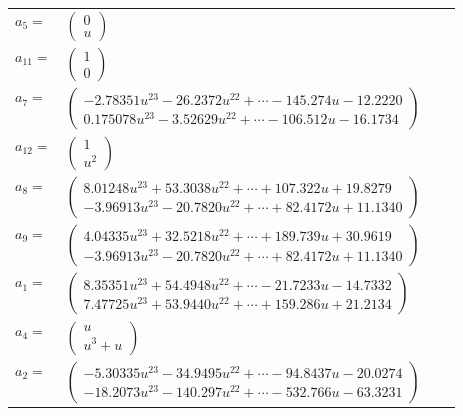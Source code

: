 \documentclass[1p]{elsarticle_modified}
\theoremstyle{definition}
\begin{document}
\begin{tabular}{m{7pt} m{180pt} m{7pt} m{180pt} }
\flushright $a_{5}=$&$\begin{pmatrix}0\\u\end{pmatrix}$ \\
\flushright $a_{11}=$&$\begin{pmatrix}1\\0\end{pmatrix}$ \\
\flushright $a_{7}=$&$\begin{pmatrix}-2.78351 u^{23}-26.2372 u^{22}+\cdots-145.274 u-12.2220\\0.175078 u^{23}-3.52629 u^{22}+\cdots-106.512 u-16.1734\end{pmatrix}$ \\
\flushright $a_{12}=$&$\begin{pmatrix}1\\u^2\end{pmatrix}$ \\
\flushright $a_{8}=$&$\begin{pmatrix}8.01248 u^{23}+53.3038 u^{22}+\cdots+107.322 u+19.8279\\-3.96913 u^{23}-20.7820 u^{22}+\cdots+82.4172 u+11.1340\end{pmatrix}$ \\
\flushright $a_{9}=$&$\begin{pmatrix}4.04335 u^{23}+32.5218 u^{22}+\cdots+189.739 u+30.9619\\-3.96913 u^{23}-20.7820 u^{22}+\cdots+82.4172 u+11.1340\end{pmatrix}$ \\
\flushright $a_{1}=$&$\begin{pmatrix}8.35351 u^{23}+54.4948 u^{22}+\cdots-21.7233 u-14.7332\\7.47725 u^{23}+53.9440 u^{22}+\cdots+159.286 u+21.2134\end{pmatrix}$ \\
\flushright $a_{4}=$&$\begin{pmatrix}u\\u^3+u\end{pmatrix}$ \\
\flushright $a_{2}=$&$\begin{pmatrix}-5.30335 u^{23}-34.9495 u^{22}+\cdots-94.8437 u-20.0274\\-18.2073 u^{23}-140.297 u^{22}+\cdots-532.766 u-63.3231\end{pmatrix}$ \\

\end{tabular}
\end{document}
